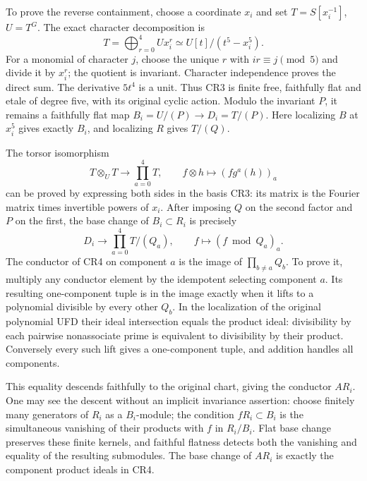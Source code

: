 \documentclass[11pt]{article}
\begin{document}
To prove the reverse containment, choose a coordinate $x_i$ and set
$T=S[x_i^{-1}]$, $U=T^G$.  The exact character decomposition is
\[
 T=\bigoplus_{r=0}^4 U x_i^r
   \simeq U[t]/(t^5-x_i^5).                                   \tag{CR3}
\]
For a monomial of character $j$, choose the unique $r$ with
$ir\equiv j\pmod5$ and divide it by $x_i^r$; the quotient is
invariant.  Character independence proves the direct sum.  The
derivative $5t^4$ is a unit.  Thus CR3 is finite free, faithfully
flat and etale of degree five, with its original cyclic action.
Modulo the invariant $P$, it remains a faithfully flat map
$B_i=U/(P)\to D_i=T/(P)$.  Here localizing $B$ at $x_i^5$
gives exactly $B_i$, and localizing $R$ gives $T/(Q)$.

The torsor isomorphism
\[
 T\otimes_U T\longrightarrow\prod_{a=0}^4T,
 \qquad f\otimes h\longmapsto(fg^a(h))_a
\]
can be proved by expressing both sides in the basis CR3: its
matrix is the Fourier matrix times invertible powers of $x_i$.
After imposing $Q$ on the second factor and $P$ on the first,
the base change of $B_i\subset R_i$ is precisely
\[
 D_i\longrightarrow\prod_{a=0}^4T/(Q_a),
 \qquad f\longmapsto(f\bmod Q_a)_a.                            \tag{CR4}
\]
The conductor of CR4 on component $a$ is the image of
$\prod_{b\ne a}Q_b$.  To prove it, multiply any conductor element
by the idempotent selecting component $a$.  Its resulting one-component
tuple is in the image exactly when it lifts to a polynomial divisible
by every other $Q_b$.  In the localization of the original polynomial
UFD their ideal intersection equals the product ideal: divisibility
by each pairwise nonassociate prime is equivalent to divisibility by
their product.  Conversely every such lift gives a one-component
tuple, and addition handles all components.

This equality descends faithfully to the original chart, giving
the conductor $AR_i$.  One may see the descent without an implicit
invariance assertion: choose finitely many generators of $R_i$ as
a $B_i$-module; the condition $fR_i\subset B_i$ is the simultaneous
vanishing of their products with $f$ in $R_i/B_i$.  Flat base change
preserves these finite kernels, and faithful flatness detects both
the vanishing and equality of the resulting submodules.  The base
change of $AR_i$ is exactly the component product ideals in CR4.
\end{document}
